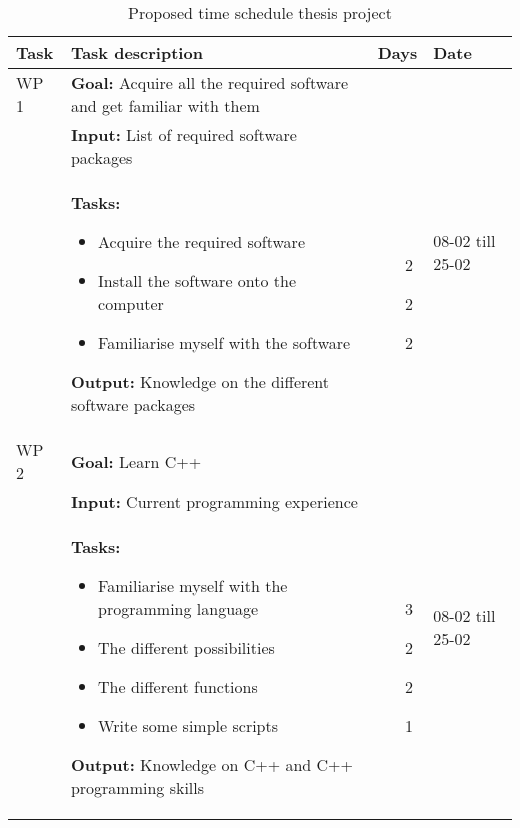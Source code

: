 \begin{longtable}{|p{2cm}|p{10cm}|p{1cm}|p{1cm}|}
\caption{Proposed time schedule thesis project}
\label{tab:prop_schedule}
\endfirsthead
\endhead
\hline 
\textbf{Task} 		& \textbf{Task description} & \textbf{Days} & \textbf{Date} \\ \hline \hline
WP 1 	& \textbf{Goal:} Acquire all the required software and get familiar with them    &  & \multirow{3}{1cm}{08-02 till 25-02}  \\ 
&\textbf{Input:} List of required software packages & & \\
& \textbf{Tasks:}
\begin{itemize}
\item Acquire the required software
\item Install the software onto the computer
\item Familiarise myself with the software
\end{itemize} 
\textbf{Output:} Knowledge on the different software packages & \noindent \begin{itemize}[leftmargin=*]
\item[2] 
\item[2] 
\item[2]
\end{itemize} & \\ \hline

WP 2 & \textbf{Goal:} Learn C++ &  & \multirow{3}{1cm}{08-02 till 25-02}  \\ 
&\textbf{Input:} Current programming experience & & \\
& \textbf{Tasks:}
\begin{itemize}
\item Familiarise myself with the programming language
\item The different possibilities
\item The different functions
\item Write some simple scripts
\end{itemize} 
\textbf{Output:} Knowledge on C++ and C++ programming skills & \noindent \begin{itemize}[leftmargin=*]
\item[3] 
\item[2] 
\item[2]
\item[1]
\end{itemize} & \\ \hline


\end{longtable}

